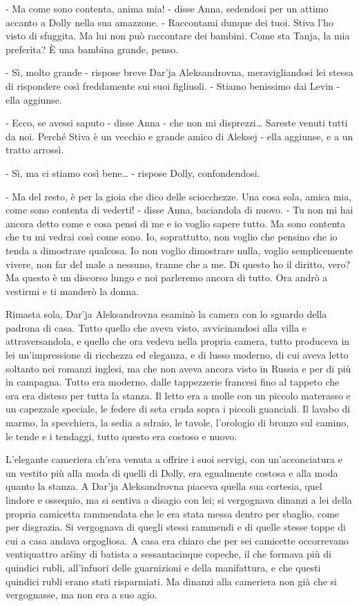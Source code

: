 - Ma come sono contenta, anima mia! - disse Anna, sedendosi per un attimo accanto a Dolly nella sua amazzone. - Raccontami dunque dei tuoi. Stiva l'ho visto di sfuggita. Ma lui non può raccontare dei bambini. Come sta Tanja, la mia preferita? È una bambina grande, penso. 

- Sì, molto grande - rispose breve Dar'ja Aleksandrovna, meravigliandosi lei stessa di rispondere così freddamente sui suoi figliuoli. - Stiamo benissimo dai Levin - ella aggiunse. 

- Ecco, se avessi saputo - disse Anna - che non mi disprezzi\ldots{} Sareste venuti tutti da noi. Perché Stiva è un vecchio e grande amico di Aleksej - ella aggiunse, e a un tratto arrossì. 

- Sì, ma ci stiamo così bene\ldots{} - rispose Dolly, confondendosi. 

- Ma del resto, è per la gioia che dico delle sciocchezze. Una cosa sola, amica mia, come sono contenta di vederti! - disse Anna, baciandola di nuovo. - Tu non mi hai ancora detto come e cosa pensi di me e io voglio sapere tutto. Ma sono contenta che tu mi vedrai così come sono. Io, soprattutto, non voglio che pensino che io tenda a dimostrare qualcosa. Io non voglio dimostrare nulla, voglio semplicemente vivere, non far del male a nessuno, tranne che a me. Di questo ho il diritto, vero? Ma questo è un discorso lungo e noi parleremo ancora di tutto. Ora andrò a vestirmi e ti manderò la donna. 

Rimasta sola, Dar'ja Aleksandrovna esaminò la camera con lo sguardo della padrona di casa. Tutto quello che aveva visto, avvicinandosi alla villa e attraversandola, e quello che ora vedeva nella propria camera, tutto produceva in lei un'impressione di ricchezza ed eleganza, e di lusso moderno, di cui aveva letto soltanto nei romanzi inglesi, ma che non aveva ancora visto in Russia e per di più in campagna. Tutto era moderno, dalle tappezzerie francesi fino al tappeto che ora era disteso per tutta la stanza. Il letto era a molle con un piccolo materasso e un capezzale speciale, le federe di seta cruda sopra i piccoli guanciali. Il lavabo di marmo, la specchiera, la sedia a sdraio, le tavole, l'orologio di bronzo sul camino, le tende e i tendaggi, tutto questo era costoso e nuovo. 

L'elegante cameriera ch'era venuta a offrire i suoi servigi, con un'acconciatura e un vestito più alla moda di quelli di Dolly, era egualmente costosa e alla moda quanto la stanza. A Dar'ja Aleksandrovna piaceva quella sua cortesia, quel lindore e ossequio, ma si sentiva a disagio con lei; si vergognava dinanzi a lei della propria camicetta rammendata che le era stata messa dentro per sbaglio, come per disgrazia. Si vergognava di quegli stessi rammendi e di quelle stesse toppe di cui a casa andava orgogliosa. A casa era chiaro che per sei camicette occorrevano ventiquattro aršiny di batista a sessantacinque copeche, il che formava più di quindici rubli, all'infuori delle guarnizioni e della manifattura, e che questi quindici rubli erano stati risparmiati. Ma dinanzi alla cameriera non già che si vergognasse, ma non era a suo agio. 

